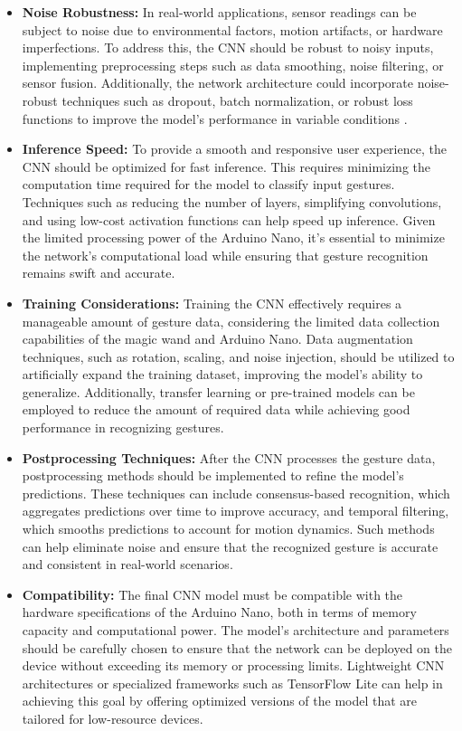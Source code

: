 \begin{itemize}
	\item \textbf{Noise Robustness:} 
	In real-world applications, sensor readings can be subject to noise due to environmental factors, motion artifacts, or hardware imperfections. To address this, the CNN should be robust to noisy inputs, implementing preprocessing steps such as data smoothing, noise filtering, or sensor fusion. Additionally, the network architecture could incorporate noise-robust techniques such as dropout, batch normalization, or robust loss functions to improve the model's performance in variable conditions \cite{Munoz:2019}.
	
	\item \textbf{Inference Speed:}
	To provide a smooth and responsive user experience, the CNN should be optimized for fast inference. This requires minimizing the computation time required for the model to classify input gestures. Techniques such as reducing the number of layers, simplifying convolutions, and using low-cost activation functions can help speed up inference. Given the limited processing power of the Arduino Nano, it's essential to minimize the network's computational load while ensuring that gesture recognition remains swift and accurate.
	
	\item \textbf{Training Considerations:} 
	Training the CNN effectively requires a manageable amount of gesture data, considering the limited data collection capabilities of the magic wand and Arduino Nano. Data augmentation techniques, such as rotation, scaling, and noise injection, should be utilized to artificially expand the training dataset, improving the model's ability to generalize. Additionally, transfer learning or pre-trained models can be employed to reduce the amount of required data while achieving good performance in recognizing gestures.
	
	\item \textbf{Postprocessing Techniques:} 
	After the CNN processes the gesture data, postprocessing methods should be implemented to refine the model's predictions. These techniques can include consensus-based recognition, which aggregates predictions over time to improve accuracy, and temporal filtering, which smooths predictions to account for motion dynamics. Such methods can help eliminate noise and ensure that the recognized gesture is accurate and consistent in real-world scenarios.
	
	\item \textbf{Compatibility:} 
	The final CNN model must be compatible with the hardware specifications of the Arduino Nano, both in terms of memory capacity and computational power. The model's architecture and parameters should be carefully chosen to ensure that the network can be deployed on the device without exceeding its memory or processing limits. Lightweight CNN architectures or specialized frameworks such as TensorFlow Lite can help in achieving this goal by offering optimized versions of the model that are tailored for low-resource devices.
	
\end{itemize}
